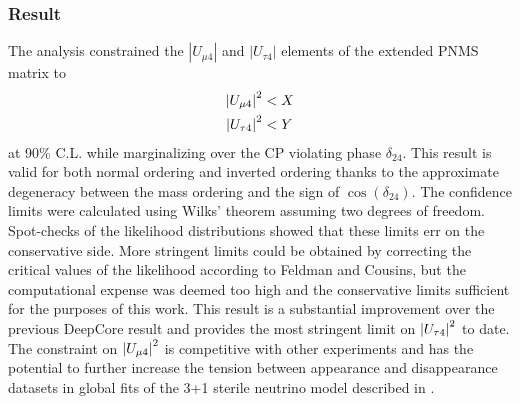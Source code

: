 \subsubsection{Result}
The analysis constrained the $|U_{\mu4}|$ and $|U_{\tau4}|$ elements of the extended PNMS matrix to
\begin{equation}
    \begin{aligned}
        \abs{U_{\mu4}}^2 &< X \\
        \abs{U_{\tau4}}^2 &< Y \\
    \end{aligned}
\end{equation}
at 90\% C.L. while marginalizing over the CP violating phase $\delta_{24}$. This result is valid for both normal ordering and inverted ordering thanks to the approximate degeneracy between the mass ordering and the sign of $\cos(\delta_{24})$. The confidence limits were calculated using Wilks' theorem assuming two degrees of freedom. Spot-checks of the likelihood distributions showed that these limits err on the conservative side. More stringent limits could be obtained by correcting the critical values of the likelihood according to Feldman and Cousins\cite{Feldman_1998}, but the computational expense was deemed too high and the conservative limits sufficient for the purposes of this work. This result is a substantial improvement over the previous DeepCore result and provides the most stringent limit on $\abs{U_{\tau4}}^2$ to date. The constraint on $\abs{U_{\mu4}}^2$ is competitive with other experiments and has the potential to further increase the tension between appearance and disappearance datasets in global fits of the 3+1 sterile neutrino model described in .

